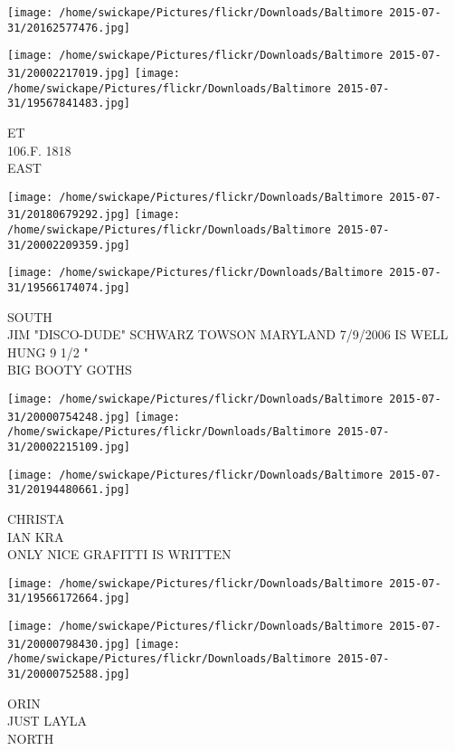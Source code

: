 \documentclass[10pt,letterpaper]{article}
\begin{document}
\texttt{[image: /home/swickape/Pictures/flickr/Downloads/Baltimore 2015-07-31/20162577476.jpg]}

\vspace{0.25in}
\texttt{[image: /home/swickape/Pictures/flickr/Downloads/Baltimore 2015-07-31/20002217019.jpg]}
\texttt{[image: /home/swickape/Pictures/flickr/Downloads/Baltimore 2015-07-31/19567841483.jpg]}

ET\\
106.F. 1818\\
EAST\\
\pagebreak

\texttt{[image: /home/swickape/Pictures/flickr/Downloads/Baltimore 2015-07-31/20180679292.jpg]}
\texttt{[image: /home/swickape/Pictures/flickr/Downloads/Baltimore 2015-07-31/20002209359.jpg]}

\vspace{0.25in}
\texttt{[image: /home/swickape/Pictures/flickr/Downloads/Baltimore 2015-07-31/19566174074.jpg]}

SOUTH\\
JIM "DISCO{-}DUDE" SCHWARZ TOWSON MARYLAND 7/9/2006 IS WELL HUNG 9 1/2 "\\
BIG BOOTY GOTHS\\
\pagebreak

\texttt{[image: /home/swickape/Pictures/flickr/Downloads/Baltimore 2015-07-31/20000754248.jpg]}
\texttt{[image: /home/swickape/Pictures/flickr/Downloads/Baltimore 2015-07-31/20002215109.jpg]}

\texttt{[image: /home/swickape/Pictures/flickr/Downloads/Baltimore 2015-07-31/20194480661.jpg]}

CHRISTA\\
IAN KRA\\
ONLY NICE GRAFITTI IS WRITTEN\\
\pagebreak

\texttt{[image: /home/swickape/Pictures/flickr/Downloads/Baltimore 2015-07-31/19566172664.jpg]}

\vspace{0.25in}
\texttt{[image: /home/swickape/Pictures/flickr/Downloads/Baltimore 2015-07-31/20000798430.jpg]}
\texttt{[image: /home/swickape/Pictures/flickr/Downloads/Baltimore 2015-07-31/20000752588.jpg]}

ORIN\\
JUST LAYLA\\
NORTH\\
\pagebreak
\end{document}
